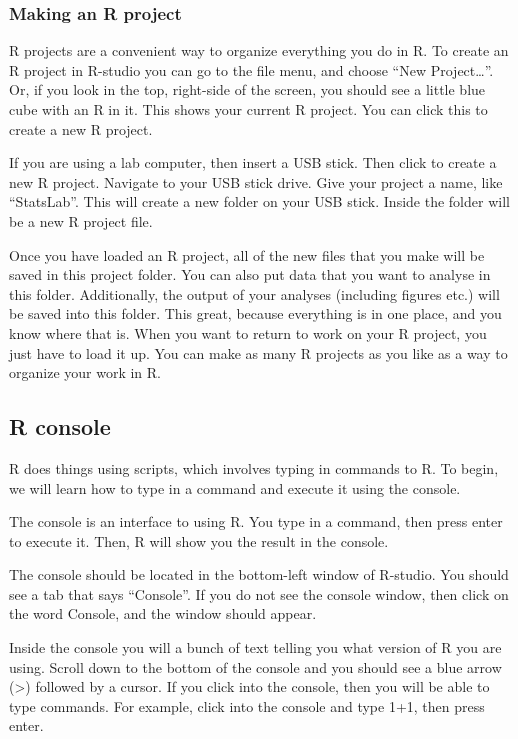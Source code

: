 \documentclass[]{book}
\theoremstyle{definition}
\theoremstyle{definition}
\theoremstyle{definition}
\theoremstyle{remark}
\begin{document}
\subsubsection{Making an R project}\label{making-an-r-project}

R projects are a convenient way to organize everything you do in R. To
create an R project in R-studio you can go to the file menu, and choose
``New Project\ldots{}''. Or, if you look in the top, right-side of the
screen, you should see a little blue cube with an R in it. This shows
your current R project. You can click this to create a new R project.

If you are using a lab computer, then insert a USB stick. Then click to
create a new R project. Navigate to your USB stick drive. Give your
project a name, like ``StatsLab''. This will create a new folder on your
USB stick. Inside the folder will be a new R project file.

Once you have loaded an R project, all of the new files that you make
will be saved in this project folder. You can also put data that you
want to analyse in this folder. Additionally, the output of your
analyses (including figures etc.) will be saved into this folder. This
great, because everything is in one place, and you know where that is.
When you want to return to work on your R project, you just have to load
it up. You can make as many R projects as you like as a way to organize
your work in R.

\subsection{R console}\label{r-console}

R does things using scripts, which involves typing in commands to R. To
begin, we will learn how to type in a command and execute it using the
console.

The console is an interface to using R. You type in a command, then
press enter to execute it. Then, R will show you the result in the
console.

The console should be located in the bottom-left window of R-studio. You
should see a tab that says ``Console''. If you do not see the console
window, then click on the word Console, and the window should appear.

Inside the console you will a bunch of text telling you what version of
R you are using. Scroll down to the bottom of the console and you should
see a blue arrow (\textgreater{}) followed by a cursor. If you click
into the console, then you will be able to type commands. For example,
click into the console and type 1+1, then press enter.
\end{document}
